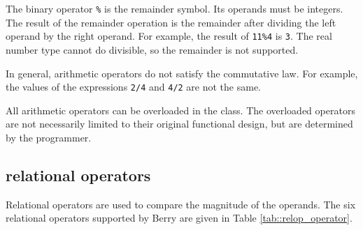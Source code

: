 The binary operator \texttt{\%} is the remainder symbol. Its operands must be integers. The result of the remainder operation is the remainder after dividing the left operand by the right operand. For example, the result of \texttt{11\%4} is \texttt{3}. The real number type cannot do divisible, so the remainder is not supported.

In general, arithmetic operators do not satisfy the commutative law. For example, the values   of the expressions \texttt{2/4} and \texttt{4/2} are not the same.

All arithmetic operators can be overloaded in the class. The overloaded operators are not necessarily limited to their original functional design, but are determined by the programmer.

\subsection {relational operators}

Relational operators are used to compare the magnitude of the operands. The six relational operators supported by Berry are given in Table \ref{tab::relop_operator}.

